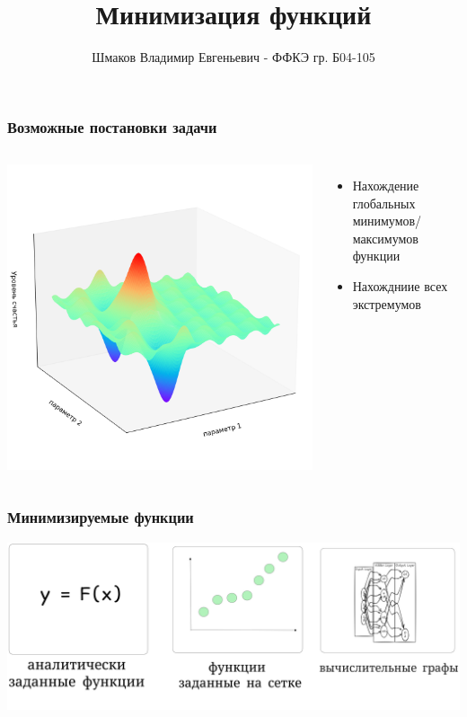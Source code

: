 \documentclass[9pt]{beamer}
\title{Минимизация функций}
\author{Шмаков Владимир Евгеньевич - ФФКЭ гр. Б04-105}
\begin{document}
\begin{frame}
    \maketitle    
\end{frame}

\begin{frame}
    \frametitle{Возможные постановки задачи}
    \begin{columns}

        \includegraphics[width = \textwidth]{happines.png}  
        \begin{itemize}
            \item Нахождение глобальных минимумов/максимумов функции
            \item Нахождниие всех экстремумов
        \end{itemize}
    \end{columns}       
\end{frame}

\begin{frame}
    \frametitle{Минимизируемые функции}
    \begin{center}
        \includegraphics[width = 1\textwidth]{types.png}    
    \end{center}
    
\end{frame}
\end{document}
